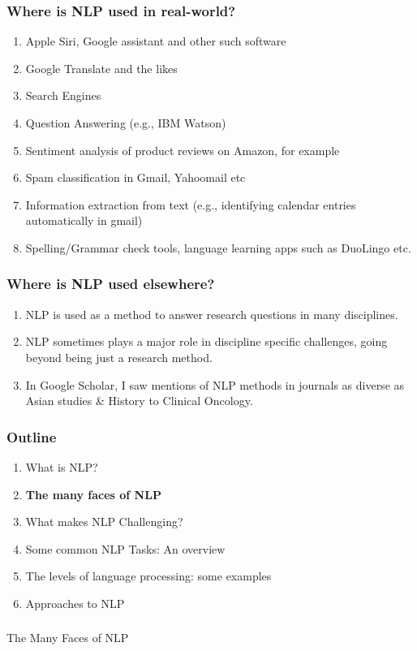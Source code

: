 \documentclass{beamer}
\begin{document}
\begin{frame}
\frametitle{Where is NLP used in real-world?}
\begin{enumerate}
\item Apple Siri, Google assistant and other such software 
\item Google Translate and the likes
\item Search Engines
\item Question Answering (e.g., IBM Watson)
\item Sentiment analysis of product reviews on Amazon, for example
\item Spam classification in Gmail, Yahoomail etc
\item Information extraction from text (e.g., identifying calendar entries automatically in gmail)
\item Spelling/Grammar check tools, language learning apps such as DuoLingo etc.
\end{enumerate}
\end{frame}

\begin{frame}
\frametitle{Where is NLP used elsewhere?}
\begin{enumerate}
\item NLP is used as a method to answer research questions in many disciplines.
\item NLP sometimes plays a major role in discipline specific challenges, going beyond being just a research method.
\item In Google Scholar, I saw mentions of NLP methods in journals as diverse as Asian studies \& History to Clinical Oncology.
\end{enumerate}
\end{frame}

\begin{frame}
\frametitle{Outline}
\begin{enumerate}
    \item What is NLP?
    \item \textbf{The many faces of NLP}
    \item What makes NLP Challenging?
    \item Some common NLP Tasks: An overview
    \item The levels of language processing: some examples
    \item Approaches to NLP
\end{enumerate}
\end{frame}

\begin{frame}
\frametitle{}
\bigskip
\Large The Many Faces of NLP
\end{frame}
\end{document}

